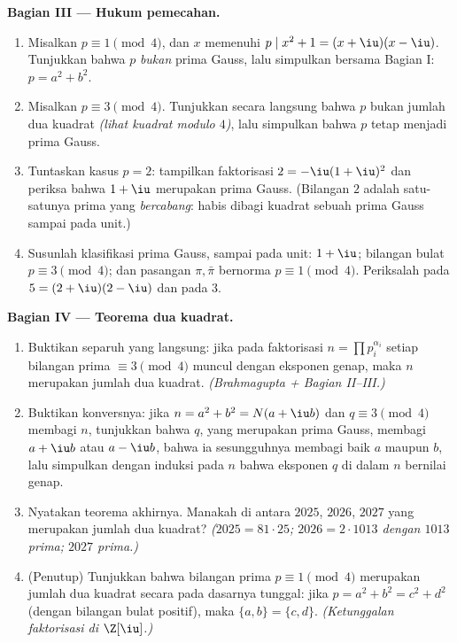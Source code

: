 \begin{problem}
\medskip
\noindent\textbf{Bagian III --- Hukum pemecahan.}
\begin{enumerate}[resume]
  \item Misalkan $p \equiv 1 \pmod 4$, dan $x$ memenuhi $p \mid x^2 + 1 =
        (x + \iu)(x - \iu)$. Tunjukkan bahwa $p$ \emph{bukan}
        prima Gauss, lalu simpulkan bersama Bagian I: $p = a^2 + b^2$.
  \item Misalkan $p \equiv 3 \pmod 4$. Tunjukkan secara langsung bahwa $p$ bukan
        jumlah dua kuadrat \emph{(lihat kuadrat modulo $4$)}, lalu simpulkan
        bahwa $p$ tetap menjadi prima Gauss.
  \item Tuntaskan kasus $p = 2$: tampilkan faktorisasi $2 =
        -\iu(1+\iu)^2$ dan periksa bahwa $1 + \iu$ merupakan prima
        Gauss. (Bilangan $2$ adalah satu-satunya prima yang \emph{bercabang}: habis dibagi
        kuadrat sebuah prima Gauss sampai pada unit.)
  \item Susunlah klasifikasi prima Gauss, sampai pada
        unit: $1 + \iu$; bilangan bulat $p \equiv 3 \pmod 4$; dan
        pasangan  $\pi, \bar\pi$ bernorma $p \equiv 1 \pmod
        4$. Periksalah pada $5 = (2+\iu)(2-\iu)$ dan pada $3$.
\end{enumerate}

\medskip
\noindent\textbf{Bagian IV --- Teorema dua kuadrat.}
\begin{enumerate}[resume]
  \item Buktikan separuh yang langsung: jika pada faktorisasi $n =
        \prod p_i^{\alpha_i}$ setiap bilangan prima $\equiv 3 \pmod 4$
        muncul dengan eksponen genap, maka $n$ merupakan jumlah dua
        kuadrat. \emph{(Brahmagupta + Bagian II--III.)}
  \item Buktikan konversnya: jika $n = a^2 + b^2 = N(a + \iu b)$ dan
        $q \equiv 3 \pmod 4$ membagi $n$, tunjukkan bahwa $q$, yang merupakan
        prima Gauss, membagi $a + \iu b$ atau $a - \iu b$, bahwa
        ia sesungguhnya membagi baik $a$ maupun $b$, lalu simpulkan dengan
        induksi pada $n$ bahwa eksponen $q$ di dalam $n$ bernilai genap.
  \item Nyatakan teorema akhirnya. Manakah di antara $2025$, $2026$, $2027$
        yang merupakan jumlah dua kuadrat? \emph{($2025 = 81 \cdot 25$;
        $2026 = 2 \cdot 1013$ dengan $1013$ prima; $2027$ prima.)}
  \item (Penutup) Tunjukkan bahwa bilangan prima $p \equiv 1 \pmod 4$ merupakan
        jumlah dua kuadrat secara pada dasarnya tunggal: jika $p =
        a^2 + b^2 = c^2 + d^2$ (dengan bilangan bulat positif), maka $\{a, b\}
        = \{c, d\}$. \emph{(Ketunggalan faktorisasi di
        $\Z[\iu]$.)}
\end{enumerate}


\end{problem}
